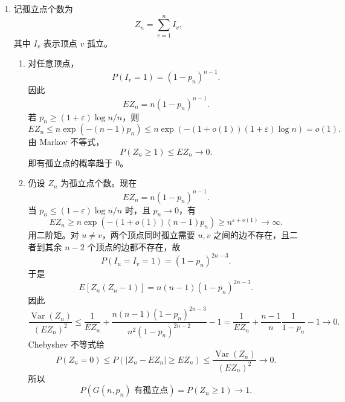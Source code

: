 \documentclass[UTF8,12pt]{ctexart}
\begin{document}
\begin{enumerate}[label=\textbf{\arabic*.},leftmargin=2.2em]
\item 记孤立点个数为
\[
Z_n=\sum_{v=1}^n I_v,
\]
其中 \(I_v\) 表示顶点 \(v\) 孤立。
\begin{enumerate}[label=\textbf{(\alph*)},leftmargin=2.4em]
\item 对任意顶点，
\[
P(I_v=1)=(1-p_n)^{n-1}.
\]
因此
\[
E Z_n=n(1-p_n)^{n-1}.
\]
若 \(p_n\ge(1+\varepsilon)\log n/n\)，则
\[
E Z_n\le n\exp(-(n-1)p_n)
\le n\exp(-(1+o(1))(1+\varepsilon)\log n)
=o(1).
\]
由 Markov 不等式，
\[
P(Z_n\ge1)\le E Z_n\to0.
\]
即有孤立点的概率趋于 \(0\)。
\item 仍设 \(Z_n\) 为孤立点个数。现在
\[
E Z_n=n(1-p_n)^{n-1}.
\]
当 \(p_n\le(1-\varepsilon)\log n/n\) 时，且 \(p_n\to0\)，有
\[
E Z_n\ge n\exp(-(1+o(1))(n-1)p_n)
\ge n^{\varepsilon+o(1)}\to\infty.
\]
用二阶矩。对 \(u\ne v\)，两个顶点同时孤立需要 \(u,v\) 之间的边不存在，且二者到其余 \(n-2\) 个顶点的边都不存在，故
\[
P(I_u=I_v=1)=(1-p_n)^{2n-3}.
\]
于是
\[
E[Z_n(Z_n-1)]
=n(n-1)(1-p_n)^{2n-3}.
\]
因此
\[
\frac{\operatorname{Var}(Z_n)}{(E Z_n)^2}
\le
\frac1{E Z_n}
+\frac{n(n-1)(1-p_n)^{2n-3}}{n^2(1-p_n)^{2n-2}}-1
=\frac1{E Z_n}+\frac{n-1}{n}\frac1{1-p_n}-1\to0.
\]
Chebyshev 不等式给
\[
P(Z_n=0)\le P(|Z_n-EZ_n|\ge EZ_n)
\le \frac{\operatorname{Var}(Z_n)}{(EZ_n)^2}\to0.
\]
所以
\[
P(G(n,p_n)\text{ 有孤立点})=P(Z_n\ge1)\to1.
\]
\end{enumerate}
\end{enumerate}
\end{document}
